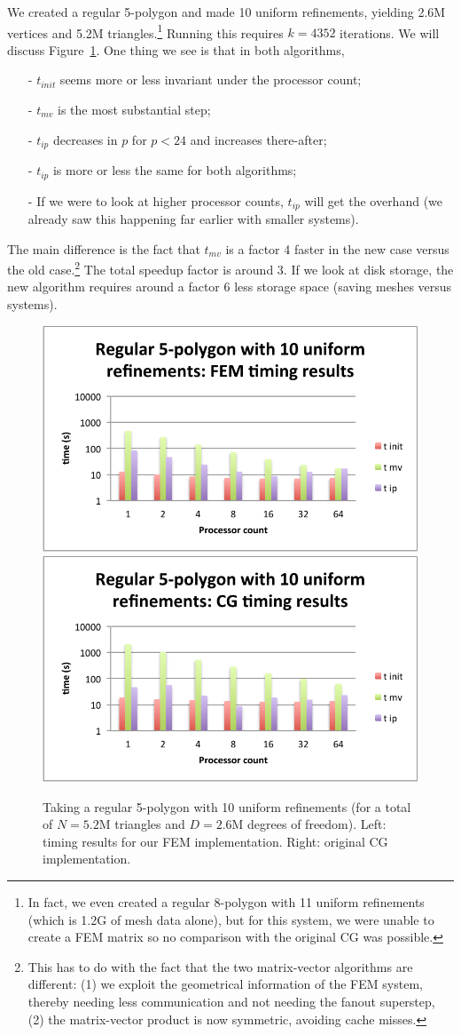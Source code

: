 \documentclass[11pt]{amsart}
\theoremstyle{definition}
\begin{document}
We created a regular 5-polygon and made 10 uniform refinements, yielding 2.6M vertices and 5.2M triangles.\footnote{In fact, we even created a regular 8-polygon with 11 uniform refinements (which is 1.2G of mesh data alone), but for this system, we were unable to create a FEM matrix so no comparison with the original CG was possible.} Running this requires $k=4352$ iterations. We will discuss Figure~\ref{fig:baazen}. One thing we see is that in both algorithms, 
\begin{itemize}
  \item[-] $t_{init}$ seems more or less invariant under the processor count; 
  \item[-] $t_{mv}$ is the most substantial step;
  \item[-] $t_{ip}$ decreases in $p$ for $p < 24$ and increases there-after;
  \item[-] $t_{ip}$ is more or less the same for both algorithms;
  \item[-] If we were to look at higher processor counts, $t_{ip}$ will get the overhand (we already saw this happening far earlier with smaller systems).
\end{itemize}
The main difference is the fact that $t_{mv}$ is a factor 4 faster in the new case versus the old case.\footnote{This has to do with the fact that the two matrix-vector algorithms are different: (1) we exploit the geometrical information of the FEM system, thereby needing less communication and not needing the fanout superstep, (2) the matrix-vector product is now symmetric, avoiding cache misses.} The total speedup factor is around 3. If we look at disk storage, the new algorithm requires around a factor 6 less storage space (saving meshes versus systems).

\begin{figure}
  \includegraphics[width=0.48\linewidth]{baazen_fem.pdf}
  \includegraphics[width=0.48\linewidth]{baazen_cg.pdf}
  \caption{Taking a regular 5-polygon with 10 uniform refinements (for a total of $N = 5.2$M triangles and $D = 2.6$M degrees of freedom). Left: timing results for our FEM implementation. Right: original CG implementation.}
  \label{fig:baazen}
\end{figure}
\end{document}
